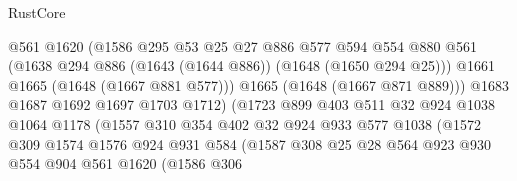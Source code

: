 \begin{lexlean}{RustCore}
\begin{coremodule}
                                  @561
                                  @1620
                                  (@1586
                                    @295
                                    @53
                                    @25
                                    @27
                                    @886
                                    @577
                                    @594
                                    @554
                                    @880
                                    @561
                                    (@1638 @294 @886 (@1643 (@1644 @886)) (@1648 (@1650 @294 @25)))
                                    @1661
                                    @1665
                                    (@1648 (@1667 @881 @577)))
                                  @1665
                                  (@1648 (@1667 @871 @889)))
                                @1683
                                @1687
                                @1692
                                @1697
                                @1703
                                @1712)
                              (@1723
                                @899
                                @403
                                @511
                                @32
                                @924
                                @1038
                                @1064
                                @1178
                                (@1557
                                  @310
                                  @354
                                  @402
                                  @32
                                  @924
                                  @933
                                  @577
                                  @1038
                                  (@1572
                                    @309
                                    @1574
                                    @1576
                                    @924
                                    @931
                                    @584
                                    (@1587
                                      @308
                                      @25
                                      @28
                                      @564
                                      @923
                                      @930
                                      @554
                                      @904
                                      @561
                                      @1620
                                      (@1586
                                        @306

\end{coremodule}
\end{lexlean}
